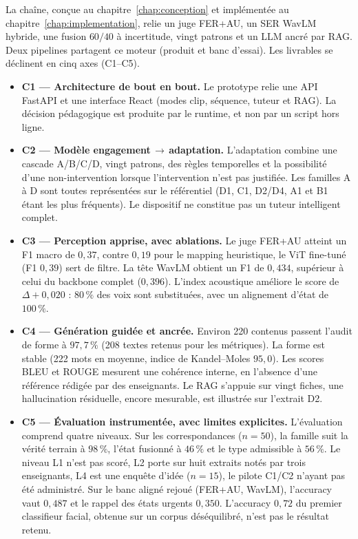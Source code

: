La chaîne, conçue au chapitre~\ref{chap:conception} et implémentée au
chapitre~\ref{chap:implementation}, relie un juge FER+AU, un SER WavLM
hybride, une fusion $60/40$ à incertitude, vingt patrons et un LLM ancré
par RAG. Deux pipelines partagent ce moteur (produit et banc d'essai).
Les livrables se déclinent en cinq axes (C1--C5).

\begin{itemize}[leftmargin=1.4em]
  \item \textbf{C1 --- Architecture de bout en bout.}
  Le prototype relie une API FastAPI et une interface React (modes clip,
  séquence, tuteur et RAG). La décision pédagogique est produite par le
  runtime, et non par un script hors ligne.

  \item \textbf{C2 --- Modèle engagement\,$\rightarrow$\,adaptation.}
  L'adaptation combine une cascade A/B/C/D, vingt patrons, des règles
  temporelles et la possibilité d'une non-intervention lorsque
  l'intervention n'est pas justifiée. Les familles A à D sont toutes
  représentées sur le référentiel (D1, C1, D2/D4, A1 et B1 étant les
  plus fréquents). Le dispositif ne constitue pas un tuteur intelligent
  complet.

  \item \textbf{C3 --- Perception apprise, avec ablations.}
  Le juge FER+AU atteint un F1 macro de $0{,}37$, contre $0{,}19$ pour
  le mapping heuristique, le ViT fine-tuné (F1 $0{,}39$) sert de
  filtre. La tête WavLM obtient un F1 de $0{,}434$, supérieur à celui
  du backbone complet ($0{,}396$). L'index acoustique améliore le score
  de $\Delta +0{,}020$ : $80\,\%$ des voix sont substituées, avec un
  alignement d'état de $100\,\%$.

  \item \textbf{C4 --- Génération guidée et ancrée.}
  Environ 220 contenus passent l'audit de forme à $97{,}7\,\%$
  (208 textes retenus pour les métriques). La forme est stable
  (222 mots en moyenne, indice de Kandel--Moles $95{,}0$). Les scores
  BLEU et ROUGE mesurent une cohérence interne, en l'absence d'une
  référence rédigée par des enseignants. Le RAG s'appuie sur vingt
  fiches, une hallucination résiduelle, encore mesurable, est
  illustrée sur l'extrait D2.

  \item \textbf{C5 --- Évaluation instrumentée, avec limites explicites.}
  L'évaluation comprend quatre niveaux. Sur les correspondances
  ($n=50$), la famille suit la vérité terrain à $98\,\%$, l'état
  fusionné à $46\,\%$ et le type admissible à $56\,\%$. Le niveau L1
  n'est pas scoré, L2 porte sur huit extraits notés par trois
  enseignants, L4 est une enquête d'idée ($n=15$), le pilote C1/C2
  n'ayant pas été administré. Sur le banc aligné rejoué (FER+AU,
  WavLM), l'accuracy vaut $0{,}487$ et le rappel des états urgents
  $0{,}350$. L'accuracy $0{,}72$ du premier classifieur facial,
  obtenue sur un corpus déséquilibré, n'est pas le résultat retenu.
\end{itemize}

